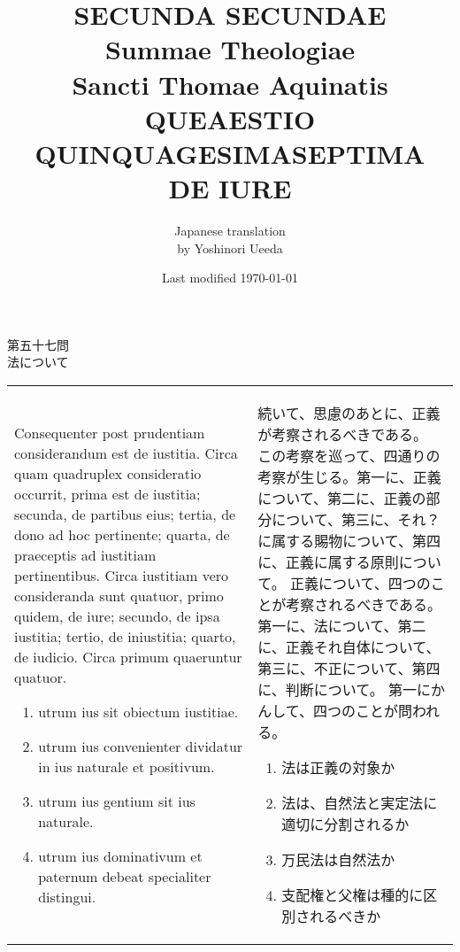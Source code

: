 \documentclass[10pt]{jsarticle} %
\title{{\bf SECUNDA SECUNDAE}\\{\HUGE Summae Theologiae}\\Sancti Thomae
Aquinatis\\{\sffamily QUEAESTIO QUINQUAGESIMASEPTIMA}\\DE IURE}
\author{Japanese translation\\by Yoshinori {\sc Ueeda}}
\date{Last modified \today}
\begin{document}
\maketitle

\begin{center}
{\Large 第五十七問\\法について}
\end{center}

\begin{longtable}{p{21em}p{21em}}

{\huge C}onsequenter post prudentiam considerandum est de iustitia. Circa quam
quadruplex consideratio occurrit, prima est de iustitia; secunda, de
partibus eius; tertia, de dono ad hoc pertinente; quarta, de praeceptis
ad iustitiam pertinentibus. Circa iustitiam vero consideranda sunt
quatuor, primo quidem, de iure; secundo, de ipsa iustitia; tertio, de
iniustitia; quarto, de iudicio. Circa primum quaeruntur quatuor. 

\begin{enumerate}
 \item  utrum ius sit obiectum iustitiae.
 \item utrum ius convenienter dividatur in ius naturale et positivum.
 \item utrum ius gentium sit ius naturale.
 \item utrum ius dominativum et paternum debeat specialiter distingui.

\end{enumerate}


&

続いて、思慮のあとに、正義が考察されるべきである。
この考察を巡って、四通りの考察が生じる。第一に、正義について、第二に、正義の部分について、第三に、それ？に属する賜物について、第四に、正義に属する原則について。
正義について、四つのことが考察されるべきである。第一に、法について、第二に、正義それ自体について、第三に、不正について、第四に、判断について。
第一にかんして、四つのことが問われる。
\begin{enumerate}
 \item 法は正義の対象か
 \item 法は、自然法と実定法に適切に分割されるか
 \item 万民法は自然法か
 \item 支配権と父権は種的に区別されるべきか
\end{enumerate}


\end{longtable}
\newpage

\end{document}

